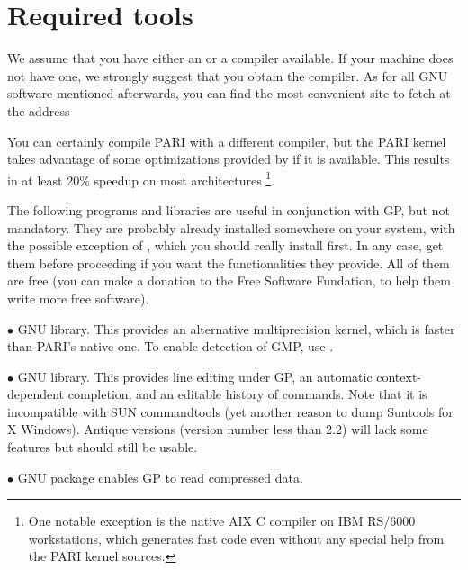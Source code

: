 %
%

\def\tocwrite#1{}
\section{Required tools}

We assume that you have either an  or a  compiler
available. If your machine does not have one, we strongly suggest that you
obtain the  compiler. As for all GNU software mentioned
afterwards, you can find the most convenient site to fetch  at the
address


\noindent You can certainly compile PARI with a different compiler, but the
PARI kernel takes advantage of some optimizations provided by  if it
is available. This results in at least 20\% speedup on most architectures%
\footnote*{One notable exception is the native AIX C compiler on IBM RS/6000
workstations, which generates fast code even without any special help from
the PARI kernel sources.}.

 The following programs and libraries are useful
in conjunction with GP, but not mandatory. They are probably already installed
somewhere on your system, with the possible exception of ,
which you should really install first. In any case, get them before
proceeding if you want the functionalities they provide. All of them are free
(you can make a donation to the Free Software Fundation, to help them write
more free software).

  $\bullet$ GNU  library. This provides an alternative multiprecision
kernel, which is faster than PARI's native one. To enable detection of GMP,
use .

  $\bullet$ GNU  library. This provides line editing under GP,
an automatic context-dependent completion, and an editable history of
commands. Note that it is incompatible with SUN commandtools (yet another
reason to dump Suntools for X Windows). Antique versions (version number less
than 2.2) will lack some features but should still be usable.

  $\bullet$ GNU  package enables GP to read compressed
data.

